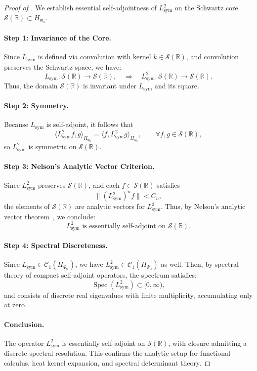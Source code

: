 \begin{proof}[Proof of ]
We establish essential self-adjointness of \( L_{\mathrm{sym}}^2 \) on the Schwartz core \( \mathcal{S}(\mathbb{R}) \subset H_{\Psi_\alpha} \).

\paragraph{Step 1: Invariance of the Core.}
Since \( L_{\mathrm{sym}} \) is defined via convolution with kernel \( k \in \mathcal{S}(\mathbb{R}) \), and convolution preserves the Schwartz space, we have:
\[
L_{\mathrm{sym}} : \mathcal{S}(\mathbb{R}) \to \mathcal{S}(\mathbb{R}), \quad \Rightarrow \quad L_{\mathrm{sym}}^2 : \mathcal{S}(\mathbb{R}) \to \mathcal{S}(\mathbb{R}).
\]
Thus, the domain \( \mathcal{S}(\mathbb{R}) \) is invariant under \( L_{\mathrm{sym}} \) and its square.

\paragraph{Step 2: Symmetry.}
Because \( L_{\mathrm{sym}} \) is self-adjoint, it follows that
\[
\langle L_{\mathrm{sym}}^2 f, g \rangle_{H_{\Psi_\alpha}} = \langle f, L_{\mathrm{sym}}^2 g \rangle_{H_{\Psi_\alpha}}, \qquad \forall f, g \in \mathcal{S}(\mathbb{R}),
\]
so \( L_{\mathrm{sym}}^2 \) is symmetric on \( \mathcal{S}(\mathbb{R}) \).

\paragraph{Step 3: Nelson's Analytic Vector Criterion.}
Since \( L_{\mathrm{sym}}^2 \) preserves \( \mathcal{S}(\mathbb{R}) \), and each \( f \in \mathcal{S}(\mathbb{R}) \) satisfies
\[
\| (L_{\mathrm{sym}}^2)^n f \| < C_n,
\]
the elements of \( \mathcal{S}(\mathbb{R}) \) are analytic vectors for \( L_{\mathrm{sym}}^2 \). Thus, by Nelson’s analytic vector theorem~\cite[Thm.~X.36]{ReedSimon1975II}, we conclude:
\[
L_{\mathrm{sym}}^2 \text{ is essentially self-adjoint on } \mathcal{S}(\mathbb{R}).
\]

\paragraph{Step 4: Spectral Discreteness.}
Since \( L_{\mathrm{sym}} \in \mathcal{C}_1(H_{\Psi_\alpha}) \), we have \( L_{\mathrm{sym}}^2 \in \mathcal{C}_1(H_{\Psi_\alpha}) \) as well. Then, by spectral theory of compact self-adjoint operators, the spectrum satisfies:
\[
\operatorname{Spec}(L_{\mathrm{sym}}^2) \subset [0, \infty),
\]
and consists of discrete real eigenvalues with finite multiplicity, accumulating only at zero.

\paragraph{Conclusion.}
The operator \( L_{\mathrm{sym}}^2 \) is essentially self-adjoint on \( \mathcal{S}(\mathbb{R}) \), with closure admitting a discrete spectral resolution. This confirms the analytic setup for functional calculus, heat kernel expansion, and spectral determinant theory.
\end{proof}
